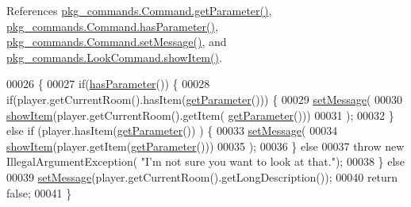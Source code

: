 References \hyperlink{Command_8java_source_l00034}{pkg\-\_\-commands.\-Command.\-get\-Parameter()}, \hyperlink{Command_8java_source_l00050}{pkg\-\_\-commands.\-Command.\-has\-Parameter()}, \hyperlink{Command_8java_source_l00058}{pkg\-\_\-commands.\-Command.\-set\-Message()}, and \hyperlink{LookCommand_8java_source_l00048}{pkg\-\_\-commands.\-Look\-Command.\-show\-Item()}.


\begin{DoxyCode}
00026                                                                           \{
00027         \textcolor{keywordflow}{if}(\hyperlink{classpkg__commands_1_1Command_a02af95ab3f1898a66259ab7c177b6998}{hasParameter}()) \{
00028             \textcolor{keywordflow}{if}(player.getCurrentRoom().hasItem(\hyperlink{classpkg__commands_1_1Command_a41c92d445be73ea9d62320c65efb8434}{getParameter}())) \{
00029                 \hyperlink{classpkg__commands_1_1Command_ae210ff216fe908b111ba1c988a963d13}{setMessage}(
00030                         \hyperlink{classpkg__commands_1_1LookCommand_a17808882dffb0a9edce192235c029ddf}{showItem}(player.getCurrentRoom().getItem(
      \hyperlink{classpkg__commands_1_1Command_a41c92d445be73ea9d62320c65efb8434}{getParameter}()))
00031                         );
00032             \} \textcolor{keywordflow}{else} \textcolor{keywordflow}{if} (player.hasItem(\hyperlink{classpkg__commands_1_1Command_a41c92d445be73ea9d62320c65efb8434}{getParameter}()) ) \{
00033                 \hyperlink{classpkg__commands_1_1Command_ae210ff216fe908b111ba1c988a963d13}{setMessage}(
00034                         \hyperlink{classpkg__commands_1_1LookCommand_a17808882dffb0a9edce192235c029ddf}{showItem}(player.getItem(\hyperlink{classpkg__commands_1_1Command_a41c92d445be73ea9d62320c65efb8434}{getParameter}()))
00035                         );
00036             \} \textcolor{keywordflow}{else}
00037                 \textcolor{keywordflow}{throw} \textcolor{keyword}{new} IllegalArgumentException( \textcolor{stringliteral}{"I'm not sure you want to look at that."});
00038         \} \textcolor{keywordflow}{else}
00039             \hyperlink{classpkg__commands_1_1Command_ae210ff216fe908b111ba1c988a963d13}{setMessage}(player.getCurrentRoom().getLongDescription());
00040         \textcolor{keywordflow}{return} \textcolor{keyword}{false};
00041     \}
\end{DoxyCode}


